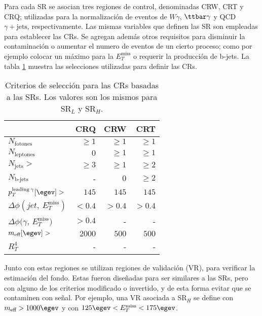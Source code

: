 Para cada SR se asocian tres regiones de control, denominadas CRW, CRT y CRQ; utilizadas para la normalización de eventos de $W\gamma$, $\ttbar\gamma$ y QCD $\gamma + \text{jets}$, respectivamente. Las mismas variables que definen las SR son empleadas para establecer las CRs. Se agregan además otros requisitos para disminuir la contaminación o aumentar el numero de eventos de un cierto proceso; como por ejemplo colocar un máximo para la $E_{T}^{\text{miss}}$ o requerir la producción de b-jets. La tabla \ref{crs} muestra las selecciones utilizadas para definir las CRs.

\begin{table}
\centering
\caption{Criterios de selección para las CRs basadas a las SRs. Los valores son los mismos para SR$_{L}$ y SR$_{H}$.}
\begin{tabular}{ l | r r r }

	\hline

	 & CRQ & CRW & CRT \\

	 \hline

	$N_{\text{fotones}}$ 	& $\ge1$ & $\ge1$ & $\ge1$ \\

	$N_{\text{leptones}}$ 	& $0$ & $\ge1$ & $\ge1$ \\

	$N_{\text{jets}}>$ 		& $\ge3$ &	$\ge1$	& $\ge2$ \\

	$N_{\text{b-jets}}$ 	& - &	$0$	& $\ge2$ \\

	$p_{T}^{\text{leading}\: \gamma} [\egev]>$ 	& $145$ 	& $145$ 	& 	$145$ \\

	$\Delta\phi(jet,\: E_{T}^{\text{miss}})$ 	& $<0.4$ 	& $>0.4$ 	&  $>0.4$\\

	$\Delta\phi(\gamma$,\: $E_{T}^{\text{miss}})$	& $>0.4$ 	& - 	& -	\\

	$m_{\text{eff}} [\egev]>$ 	& $2000$ 	& $500$ 	& $500$	\\

	$R_{T}^{4}$ 	& - 	& - 	& -	\\

	\hline

\end{tabular}
\label{crs}
\end{table}


Junto con estas regiones se utilizan regiones de validación (VR), para verificar la estimación del fondo. Estas fueron diseñadas para ser similares a las SRs, pero con alguno de los criterios modificado o invertido, y de esta forma evitar que se contaminen con señal. Por ejemplo, una VR asociada a SR$_{H}$ se define con $m_{\text{eff}}>1000 \egev$ y con $125 \egev < E_{T}^{\text{miss}} < 175 \egev$. 
